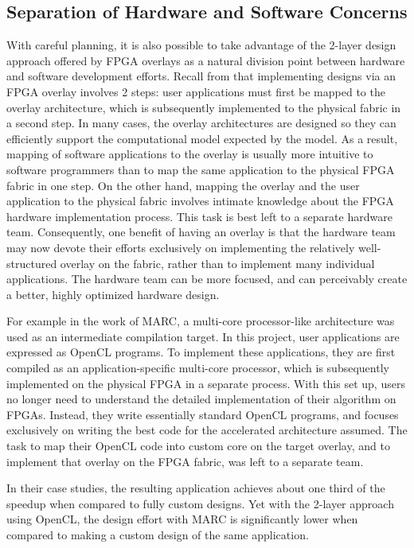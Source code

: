 \subsection{Separation of Hardware and Software Concerns}
With careful planning, it is also possible to take advantage of the 2-layer design approach offered by FPGA overlays as a natural division point between hardware and software development efforts.
Recall from  that implementing designs via an FPGA overlay involves 2 steps: user applications must first be mapped to the overlay architecture, which is subsequently implemented to the physical fabric in a second step.
In many cases, the overlay architectures are designed so they can efficiently support the computational model expected by the model.
As a result, mapping of software applications to the overlay is usually more intuitive to software programmers than to map the same application to the physical FPGA fabric in one step.
On the other hand, mapping the overlay and the user application to the physical fabric involves intimate knowledge about the FPGA hardware implementation process.
This task is best left to a separate hardware team.
Consequently, one benefit of having an overlay is that the hardware team may now devote their efforts exclusively on implementing the relatively well-structured overlay on the fabric, rather than to implement many individual applications.
The hardware team can be more focused, and can perceivably create a better, highly optimized hardware design.

For example in the work of MARC\cite{lavin2011}, a multi-core processor-like architecture was used as an intermediate compilation target.
In this project, user applications are expressed as OpenCL programs.
To implement these applications, they are first compiled as an application-specific multi-core processor, which is subsequently implemented on the physical FPGA in a separate process.
With this set up, users no longer need to understand the detailed implementation of their algorithm on FPGAs.
Instead, they write essentially standard OpenCL programs, and focuses exclusively on writing the best code for the accelerated architecture assumed.
The task to map their OpenCL code into custom core on the target overlay, and to implement that overlay on the FPGA fabric, was left to a separate team.

In their case studies, the resulting application achieves about one third of the speedup when compared to fully custom designs.
Yet with the 2-layer approach using OpenCL, the design effort with MARC is significantly lower when compared to making a custom design of the same application.




